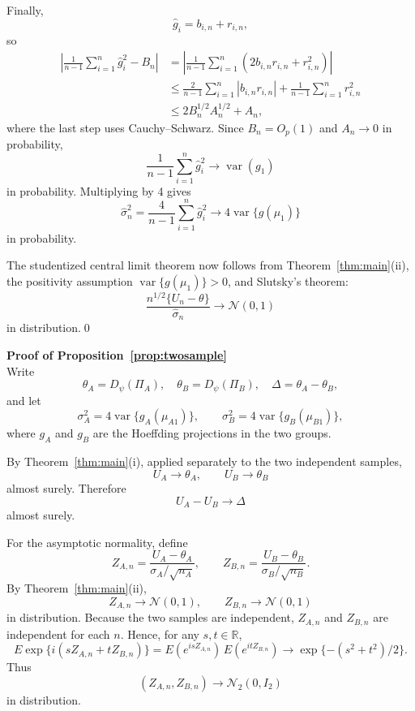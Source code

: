 \documentclass[10pt]{article}
\newcommand{\R}{\mathbb{R}}
\begin{document}
Finally,
\[
\widehat g_i=b_{i,n}+r_{i,n},
\]
so
\begin{align*}
\left|
\frac{1}{n-1}\sum_{i=1}^n \widehat g_i^2 - B_n
\right|
&=
\left|
\frac{1}{n-1}\sum_{i=1}^n (2b_{i,n}r_{i,n}+r_{i,n}^2)
\right|\\
&\leq
\frac{2}{n-1}\sum_{i=1}^n |b_{i,n}r_{i,n}|
+
\frac{1}{n-1}\sum_{i=1}^n r_{i,n}^2\\
&\leq
2B_n^{1/2}A_n^{1/2}
+
A_n,
\end{align*}
where the last step uses Cauchy--Schwarz. Since $B_n=O_p(1)$ and $A_n\to 0$ in probability,
\[
\frac{1}{n-1}\sum_{i=1}^n \widehat g_i^2
\to
\operatorname{var}(g_1)
\]
in probability. Multiplying by 4 gives
\[
\widehat\sigma_n^2
=
\frac{4}{n-1}\sum_{i=1}^n \widehat g_i^2
\to
4\operatorname{var}\{g(\mu_1)\}
\]
in probability.

The studentized central limit theorem now follows from Theorem~\ref{thm:main}(ii), the positivity assumption $\operatorname{var}\{g(\mu_1)\}>0$, and Slutsky's theorem:
\[
\frac{n^{1/2}\{U_n-\theta\}}{\widehat\sigma_n}
\to \mathcal{N}(0,1)
\]
in distribution.\qed 



\vspace{1cm}
\noindent \textbf{Proof of Proposition~\ref{prop:twosample}}\\
Write
\[
\theta_A=D_{\psi}(\Pi_A),\quad
\theta_B=D_{\psi}(\Pi_B),\quad
\Delta=\theta_A-\theta_B,
\]
and let
\[
\sigma_A^2=4\operatorname{var}\{g_A(\mu_{A1})\},
\qquad
\sigma_B^2=4\operatorname{var}\{g_B(\mu_{B1})\},
\]
where $g_A$ and $g_B$ are the Hoeffding projections in the two groups.

By Theorem~\ref{thm:main}(i), applied separately to the two independent samples,
\[
U_A\to \theta_A,
\qquad
U_B\to \theta_B
\]
almost surely. Therefore
\[
U_A-U_B\to \Delta
\]
almost surely.

For the asymptotic normality, define
\[
Z_{A,n}=\frac{U_A-\theta_A}{\sigma_A/\sqrt{n_A}},
\qquad
Z_{B,n}=\frac{U_B-\theta_B}{\sigma_B/\sqrt{n_B}}.
\]
By Theorem~\ref{thm:main}(ii),
\[
Z_{A,n}\to \mathcal{N}(0,1),
\qquad
Z_{B,n}\to \mathcal{N}(0,1)
\]
in distribution. Because the two samples are independent, $Z_{A,n}$ and $Z_{B,n}$ are independent for each $n$. Hence, for any $s,t\in\R$,
\[
E\exp\{i(sZ_{A,n}+tZ_{B,n})\}
=
E(e^{isZ_{A,n}})\,E(e^{itZ_{B,n}})
\to
\exp\{-(s^2+t^2)/2\}.
\]
Thus
\[
(Z_{A,n},Z_{B,n})\to \mathcal{N}_2(0,I_2)
\]
in distribution.
\end{document}
